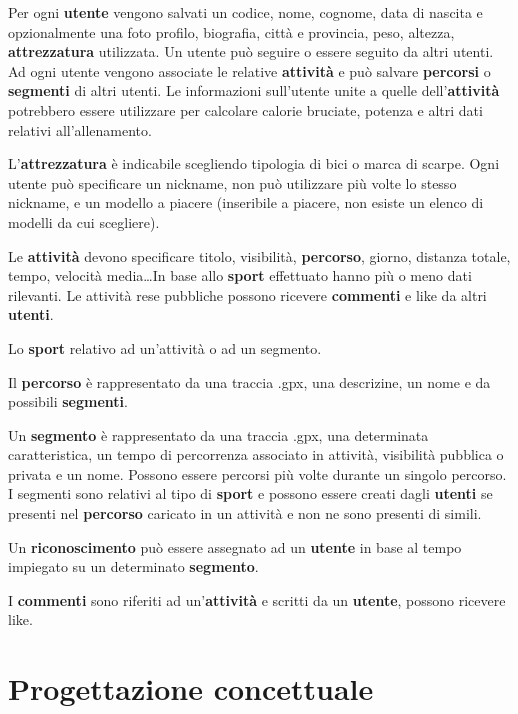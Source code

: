 \documentclass[12pt]{report}
\begin{document}
\vspace{12pt}

Per ogni \textbf{utente} vengono salvati un codice, nome, cognome, data di nascita e opzionalmente una foto profilo,
biografia, città e provincia, peso, altezza, \textbf{attrezzatura} utilizzata. Un utente può seguire o essere seguito 
da altri utenti. Ad ogni utente vengono associate le relative \textbf{attività} e può salvare \textbf{percorsi} o 
\textbf{segmenti} di altri utenti. Le informazioni sull'utente unite a quelle dell'\textbf{attività} potrebbero essere
utilizzare per calcolare calorie bruciate, potenza e altri dati relativi all'allenamento.

L'\textbf{attrezzatura} è indicabile scegliendo tipologia di bici o marca di scarpe. Ogni utente può specificare un nickname,
non può utilizzare più volte lo stesso nickname, e un modello a piacere (inseribile a piacere, non esiste un elenco 
di modelli da cui scegliere).

Le \textbf{attività} devono specificare titolo, visibilità, \textbf{percorso}, giorno, distanza totale,
tempo, velocità media\dots In base allo \textbf{sport} effettuato hanno più o meno dati rilevanti. Le attività rese pubbliche 
possono ricevere \textbf{commenti} e like da altri \textbf{utenti}.

Lo \textbf{sport} relativo ad un'attività o ad un segmento.

Il \textbf{percorso} è rappresentato da una traccia .gpx, una descrizine, un nome e da possibili \textbf{segmenti}.

Un \textbf{segmento} è rappresentato da una traccia .gpx, una determinata caratteristica, un tempo di
percorrenza associato in attività, visibilità pubblica o privata e un nome. Possono essere percorsi più volte durante un singolo
percorso. I segmenti sono relativi al tipo di \textbf{sport} e possono 
essere creati dagli \textbf{utenti} se presenti nel \textbf{percorso} caricato in un attività e non ne sono presenti 
di simili.

Un \textbf{riconoscimento} può essere assegnato ad un \textbf{utente} in base al tempo impiegato su un determinato 
\textbf{segmento}.

I \textbf{commenti} sono riferiti ad un'\textbf{attività} e scritti da un \textbf{utente}, possono ricevere like.

\chapter{Progettazione concettuale}
\end{document}
